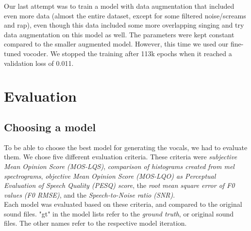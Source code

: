 \documentclass[a4paper]{article}
\begin{document}
	Our last attempt was to train a model with data augmentation that included even more data (almost the entire dataset, except for some filtered noise/screams and rap), even though this data included some more overlapping singing and try data augmentation on this model as well. The parameters were kept constant compared to the smaller augmented model. However, this time we used our fine-tuned vocoder. We stopped the training after 113k epochs when it reached a validation loss of 0.011.
	
	\newpage
	
	\section{Evaluation}
	
	\subsection{Choosing a model}
	
	To be able to choose the best model for generating the vocals, we had to
	evaluate them. We chose five different evaluation criteria. These criteria were
	\emph{subjective Mean Opinion Score (MOS-LQS)}, \emph{comparison of histograms
		created from mel spectrograms}, \emph{objective Mean Opinion Score (MOS-LQO) as
		Perceptual Evaluation of Speech Quality (PESQ) score}, the \emph{root mean
		square error of F0 values (F0 RMSE)}, and the \emph{Speech-to-Noise ratio
		(SNR)}. \\
	Each model was evaluated based on these criteria, and compared to the original
	sound files. "gt" in the model lists refer to the \emph{ground truth}, or
	original sound files. The other names refer to the respective model iteration.
	
\end{document}
